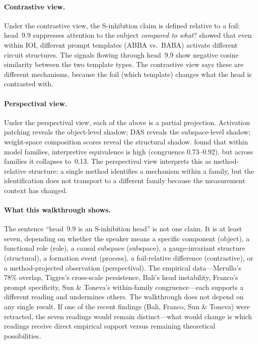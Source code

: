 \documentclass{article}
\begin{document}
\paragraph{Contrastive view.}
Under the contrastive view, the S-inhibition claim is defined relative
to a foil: head~9.9 suppresses attention to the subject
\emph{compared to what}?  \citet{franco2026} showed that even within
IOI, different prompt templates (ABBA vs.\ BABA) activate different
circuit structures.  The signals flowing through head~9.9 show negative cosine similarity
between the two template types.
The contrastive view says these are different mechanisms, because the
foil (which template) changes what the head is contrasted with.

\paragraph{Perspectival view.}
Under the perspectival view, each of the above is a partial projection.
Activation patching reveals the object-level shadow; DAS reveals the
subspace-level shadow; weight-space composition scores reveal the
structural shadow.  \citet{sun2026} found that within model families,
interpretive equivalence is high (congruence 0.73--0.92), but across
families it collapses to~0.13.  The perspectival view interprets this
as method-relative structure: a single method identifies a mechanism
within a family, but the identification does not transport to a
different family because the measurement context has changed.

\paragraph{What this walkthrough shows.}
The sentence ``head~9.9 is an S-inhibition head'' is not one claim.
It is at least seven, depending on whether the speaker means a
specific component (object), a functional role (role), a causal
subspace (subspace), a gauge-invariant structure (structural), a
formation event (process), a foil-relative difference (contrastive),
or a method-projected observation (perspectival).  The empirical
data---Merullo's 78\% overlap, Tigges's cross-scale persistence,
Bali's head instability, Franco's prompt specificity, Sun \& Toneva's
within-family congruence---each supports a different reading and
undermines others.  The walkthrough does not depend on any single result.  If one of the recent findings (Bali, Franco, Sun \& Toneva) were retracted, the seven readings would remain distinct---what would change is which readings receive direct empirical support versus remaining theoretical possibilities.
\end{document}
